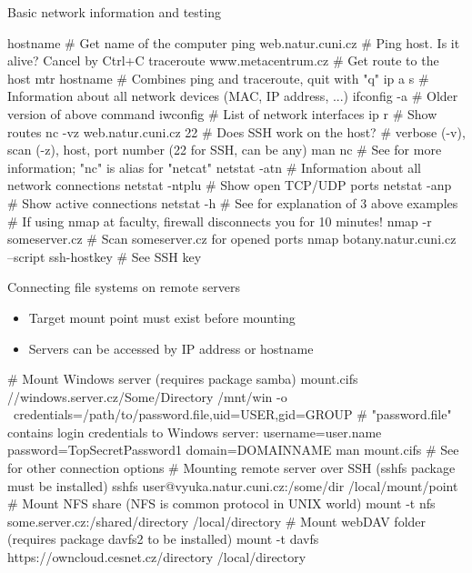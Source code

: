 \documentclass[compress, ucs, xelatex, 11pt, xcolor=svgnames,
  hyperref={
    bookmarks=true,
    unicode=true,
    colorlinks=true,
    pdftitle={Linux, command line and MetaCentrum},
    plainpages=false,
    pdfauthor={Vojtech Zeisek},
    pdfsubject={Course about use of Linux command line, writing shell scripts and using MetaCentrum of CESNET},
    pdfcreator={XeLaTeX},
    pdfkeywords={Linux, GNU, BASH, shell, command line, MetaCentrum},
    linkcolor=DarkRed,
    anchorcolor=DarkBlue,
    citecolor=Indigo,
    filecolor=NavyBlue,
    menucolor=DarkMagenta,
    urlcolor=DarkBlue,
    pdftex},
  url={hyphens, lowtilde} %
  ]{beamer}
\begin{document}
\begin{frame}[fragile]{Basic network information and testing}
  \begin{bashcode}
    hostname # Get name of the computer
    ping web.natur.cuni.cz # Ping host. Is it alive? Cancel by Ctrl+C
    traceroute www.metacentrum.cz # Get route to the host
    mtr hostname # Combines ping and traceroute, quit with "q"
    ip a s # Information about all network devices (MAC, IP address, ...)
    ifconfig -a # Older version of above command
    iwconfig # List of network interfaces
    ip r # Show routes
    nc -vz web.natur.cuni.cz 22 # Does SSH work on the host?
      # verbose (-v), scan (-z), host, port number (22 for SSH, can be any)
    man nc # See for more information; "nc" is alias for "netcat"
    netstat -atn # Information about all network connections
    netstat -ntplu # Show open TCP/UDP ports
    netstat -anp # Show active connections
    netstat -h # See for explanation of 3 above examples
    # If using nmap at faculty, firewall disconnects you for 10 minutes!
    nmap -r someserver.cz # Scan someserver.cz for opened ports
    nmap botany.natur.cuni.cz --script ssh-hostkey # See SSH key
  \end{bashcode}
\end{frame}

\begin{frame}[fragile]{Connecting file systems on remote servers}
  \begin{itemize}
    \item Target mount point must exist before mounting
    \item Servers can be accessed by IP address or hostname
  \end{itemize}
  \begin{bashcode}
    # Mount Windows server (requires package samba)
    mount.cifs //windows.server.cz/Some/Directory /mnt/win -o \
      credentials=/path/to/password.file,uid=USER,gid=GROUP
    # "password.file" contains login credentials to Windows server:
    username=user.name
    password=TopSecretPassword1
    domain=DOMAINNAME
    man mount.cifs # See for other connection options
    # Mounting remote server over SSH (sshfs package must be installed)
    sshfs user@vyuka.natur.cuni.cz:/some/dir /local/mount/point
    # Mount NFS share (NFS is common protocol in UNIX world)
    mount -t nfs some.server.cz:/shared/directory /local/directory
    # Mount webDAV folder (requires package davfs2 to be installed)
    mount -t davfs https://owncloud.cesnet.cz/directory /local/directory
  \end{bashcode}
\end{frame}
\end{document}
